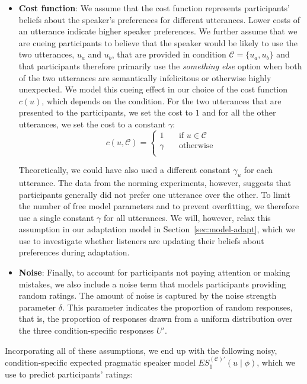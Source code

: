 \documentclass[lucida,biblatex]{sp} %
\newcommand{\sectionref}[1]{Section~\ref{#1}}
\begin{document}
\begin{itemize}
\item \textbf{Cost function}: We assume that the cost function represents participants' beliefs about the speaker's 
preferences for different utterances. Lower costs of an utterance indicate higher speaker preferences. We further 
assume that we are cueing participants to believe that the speaker would be likely to use the two utterances, $u_a$ 
and $u_b$, that are provided in condition $\mathscr{C}=\{u_a, u_b\}$ and that participants therefore primarily use the 
\textit{something else} option when both of the two utterances are semantically infelicitous or otherwise highly unexpected. 
We model this cueing effect in our choice of the cost function $c(u)$, which depends on the condition. For the two utterances 
that are presented to the participants, we set the cost to $1$ and for all the other utterances, we set the cost to a constant $\gamma$:
$$
c(u, \mathscr{C}) = 
     \begin{cases}
       1 &\quad\text{if } u  \in \mathscr{C}\\
       \gamma &\quad\text{otherwise} \\
     \end{cases}
$$

Theoretically, we could have also used a different constant $\gamma_u$ for each utterance. The data from
the norming experiments, however, suggests that participants generally did not prefer one utterance over 
the other. To limit the number of free model parameters and to prevent overfitting, we therefore use a single
constant $\gamma$ for all utterances. We will, however, relax this assumption in our adaptation model in \sectionref{sec:model-adapt}, which
we use to investigate whether listeners are updating their beliefs about preferences during adaptation.

\item \textbf{Noise}: Finally, to account for participants not paying attention or making mistakes, 
we also include a noise term that models participants providing random ratings.
The amount of noise is captured by the noise strength parameter $\delta$. This parameter
indicates the proportion of random responses, that is, the proportion of responses drawn from a uniform distribution
over the three condition-specific responses $U'$. 

\end{itemize}

\noindent Incorporating all of these assumptions, we end up with the following noisy, condition-specific expected pragmatic speaker 
model $ES_1^{(\mathscr{C})'}(u \mid \phi)$, which we use to predict participants' ratings:
\end{document}

